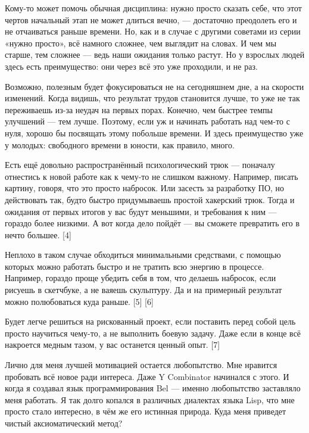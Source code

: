 \documentclass[ebook,12pt,oneside,openany]{memoir}
\begin{document}
Кому-то может помочь обычная дисциплина: нужно просто сказать себе,
что этот чертов начальный этап не может длиться вечно, — достаточно
преодолеть его и не отчаиваться раньше времени. Но, как и в случае с
другими советами из серии «нужно просто», всё намного сложнее, чем
выглядит на словах. И чем мы старше, тем сложнее — ведь наши ожидания
только растут. Но у взрослых людей здесь есть преимущество: они через
всё это уже проходили, и не раз. \newline

Возможно, полезным будет фокусироваться не на сегодняшнем дне, а на
скорости изменений. Когда видишь, что результат трудов становится
лучше, то уже не так переживаешь из-за неудач на первых порах.
Конечно, чем быстрее темпы улучшений — тем лучше. Поэтому, если уж и
начинать работать над чем-то с нуля, хорошо бы посвящать этому
побольше времени. И здесь преимущество уже у молодых: свободного
времени в юности, как правило, много. \newline

Есть ещё довольно распространённый психологический трюк — поначалу
отнестись к новой работе как к чему-то не слишком важному. Например,
писать картину, говоря, что это просто набросок. Или засесть за
разработку ПО, но действовать так, будто быстро придумываешь простой
хакерский трюк. Тогда и ожидания от первых итогов у вас будут
меньшими, и требования к ним — гораздо более низкими. А вот когда дело
пойдёт — вы сможете превратить его в нечто большее. [4] \newline

Неплохо в таком случае обходиться минимальными средствами, с помощью
которых можно работать быстро и не тратить всю энергию в процессе.
Например, гораздо проще убедить себя в том, что делаешь набросок, если
рисуешь в скетчбуке, а не ваяешь скульптуру. Да и на примерный
результат можно полюбоваться куда раньше. [5] [6] \newline

Будет легче решиться на рискованный проект, если поставить перед собой
цель просто научиться чему-то, а не выполнить боевую задачу. Даже если
в конце всё накроется медным тазом, у вас останется ценный опыт. [7] \newline

Лично для меня лучшей мотивацией остается любопытство. Мне нравится
пробовать всё новое ради интереса. Даже Y Combinator начинался с
этого. И когда я создавал язык программирования Bel — именно
любопытство заставляло меня работать. Я так долго копался в различных
диалектах языка Lisp, что мне просто стало интересно, в чём же его
истинная природа. Куда меня приведет чистый аксиоматический метод? \newline
\end{document}

